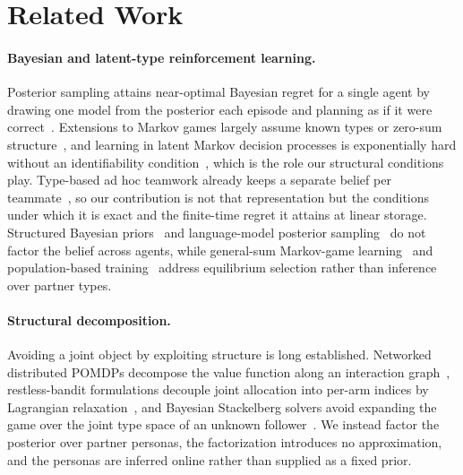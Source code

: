 \documentclass[letterpaper]{article} %
\begin{document}
\section{Related Work}
\label{sec:related}

\paragraph{Bayesian and latent-type reinforcement learning.} Posterior sampling attains near-optimal Bayesian regret for a single agent by drawing one model from the posterior each episode and planning as if it were correct~\citep{strens2000bayesian,osband2013more,agrawal2017optimistic,ouyang2017learning,russo2014learning,russo2016information,dasgupta2025bayesian}. Extensions to Markov games largely assume known types or zero-sum structure~\citep{jahromi2024bayesian,xiong2022self}, and learning in latent Markov decision processes is exponentially hard without an identifiability condition~\citep{kwon2021rl,nguyen2024learning}, which is the role our structural conditions play. Type-based ad hoc teamwork already keeps a separate belief per teammate~\citep{albrecht2015game,albrecht2019convergence,barrett2011empirical,albrecht2018autonomous}, so our contribution is not that representation but the conditions under which it is exact and the finite-time regret it attains at linear storage. Structured Bayesian priors~\citep{mutti2024exploiting} and language-model posterior sampling~\citep{arumugam2025toward} do not factor the belief across agents, while general-sum Markov-game learning~\citep{jin2024v,song2021can,mao2023provably,erez2023regret,yang2025incentivize} and population-based training~\citep{lanctot2017unified,muller2019generalized,marris2021multi} address equilibrium selection rather than inference over partner types.

\paragraph{Structural decomposition.} Avoiding a joint object by exploiting structure is long established. Networked distributed POMDPs decompose the value function along an interaction graph~\citep{nair2005networked,oliehoek2008exploiting}, restless-bandit formulations decouple joint allocation into per-arm indices by Lagrangian relaxation~\citep{mate2020collapsing}, and Bayesian Stackelberg solvers avoid expanding the game over the joint type space of an unknown follower~\citep{paruchuri2008playing}. We instead factor the posterior over partner personas, the factorization introduces no approximation, and the personas are inferred online rather than supplied as a fixed prior.
\end{document}
